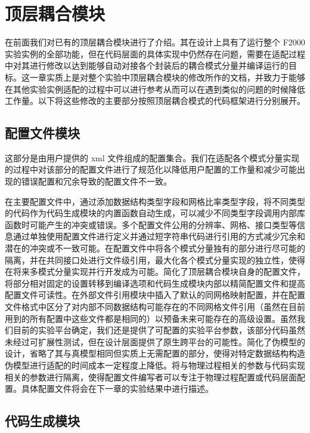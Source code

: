 \chapter{顶层耦合模块}
\label{cha:coupler}

在前面我们对已有的顶层耦合模块进行了介绍。其在设计上具有了运行整个 F2000 实验实例的全部功能，但在代码层面的具体实现中仍然存在问题，需要在适配过程中对其进行修改以达到能够自动对接各个封装后的耦合模式分量并编译运行的目标。这一章实质上是对整个实验中顶层耦合模块的修改所作的文档，并致力于能够在其他实验实例适配的过程中可以进行参考从而可以在遇到类似的问题的时候降低工作量。以下将这些修改的主要部分按照顶层耦合模式的代码框架进行分别展开。

\section{配置文件模块}

这部分是由用户提供的 xml 文件组成的配置集合。我们在适配各个模式分量实现的过程中对该部分的配置文件进行了规范化以降低用户配置的工作量和减少可能出现的错误配置和冗余导致的配置文件不一致。

在主要配置文件中，通过添加数据结构类型字段和网格比率类型字段，将不同类型的代码作为代码生成模块的内置函数自动生成，可以减少不同类型字段调用内部库函数时可能产生的冲突或错误。多个配置文件公用的分辨率、网格、接口类型等信息通过单独使用配置文件进行定义并通过短字符串代码进行引用的方式减少冗余和潜在的冲突或不一致可能。在配置文件中将各个模式分量独有的部分进行尽可能的隔离，并在共同接口处进行文件级引用，最大化各个模式分量实现的独立性，使得在将来多模式分量实现并行开发成为可能。简化了顶层耦合模块自身的配置文件，将部分相对固定的设置转移到编译选项和代码生成模块内部以精简配置文件和提高配置文件可读性。在外部文件引用模块中插入了默认的同网格映射配置，并在配置文件格式中区分了对内部不同数据结构可能存在的不同网格文件引用（虽然在目前用到的所有配置中这些文件都是相同的）以预备未来可能存在的高级设置。虽然我们目前的实验平台确定，我们还是提供了可配置的实验平台参数，该部分代码虽然未经过可扩展性测试，但在设计层面提供了原生跨平台的可能性。简化了伪模型的设计，省略了其与真模型相同但实质上无需配置的部分，使得对特定数据结构构造伪模型进行适配的时间成本一定程度上降低。将与物理过程相关的参数与代码实现相关的参数进行隔离，使得配置文件编写者可以专注于物理过程配置或代码层面配置。具体配置文件将会在下一章的实验结果中进行描述。

\section{代码生成模块}


